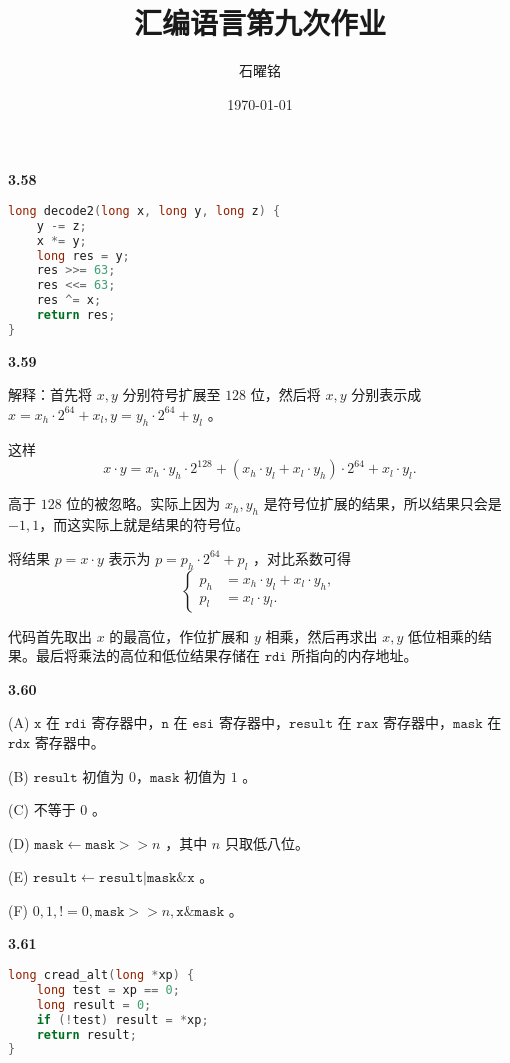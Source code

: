 \documentclass{article}
\title{汇编语言第九次作业}
\author{石曜铭}
\date{\today}
\begin{document}
\maketitle

\textbf{3.58}

\begin{lstlisting}[language=C]
long decode2(long x, long y, long z) {
	y -= z;
	x *= y;
	long res = y;
	res >>= 63;
	res <<= 63;
	res ^= x;
	return res;
}
\end{lstlisting}

\textbf{3.59}

解释：首先将 $x, y$ 分别符号扩展至 $128$ 位，然后将 $x, y$ 分别表示成 $x = x_h \cdot 2^{64} + x_l, y = y_h \cdot 2^{64} + y_l$ 。

这样 
$$
x \cdot y = x_h\cdot y_h \cdot 2^{128} + (x_h\cdot y_l + x_l \cdot y_h) \cdot 2^{64} + x_l\cdot y_l.
$$

高于 $128$ 位的被忽略。实际上因为 $x_h, y_h$ 是符号位扩展的结果，所以结果只会是 $-1, 1$，而这实际上就是结果的符号位。

将结果 $p = x\cdot y$ 表示为 $p = p_h \cdot 2^{64} + p_l$ ，对比系数可得
$$
\begin{cases}
p_h &= x_h \cdot y_l + x_l \cdot y_h, \\ 
p_l &= x_l \cdot y_l.
\end{cases}
$$

代码首先取出 $x$ 的最高位，作位扩展和 $y$ 相乘，然后再求出 $x, y$ 低位相乘的结果。最后将乘法的高位和低位结果存储在 $\texttt{rdi}$ 所指向的内存地址。

\textbf{3.60}

(A) $\texttt{x}$ 在 $\texttt{rdi}$ 寄存器中，$\texttt{n}$ 在 $\texttt{esi}$ 寄存器中，$\texttt{result}$ 在 $\texttt{rax}$ 寄存器中，$\texttt{mask}$ 在 $\texttt{rdx}$ 寄存器中。

(B) $\texttt{result}$ 初值为 $0$，$\texttt{mask}$ 初值为 $1$ 。

(C) 不等于 $0$ 。

(D) $\texttt{mask} \leftarrow \texttt{mask} >> n$ ，其中 $n$ 只取低八位。

(E) $\texttt{result} \leftarrow \texttt{result} | \texttt{mask} \& \texttt{x}$ 。

(F) $0, 1, != 0, \texttt{mask} >> n, \texttt{x} \& \texttt{mask}$ 。

\textbf{3.61}

\begin{lstlisting}[language=C]
long cread_alt(long *xp) {
	long test = xp == 0;
	long result = 0; 
	if (!test) result = *xp;
	return result;
}
\end{lstlisting}
\end{document}
